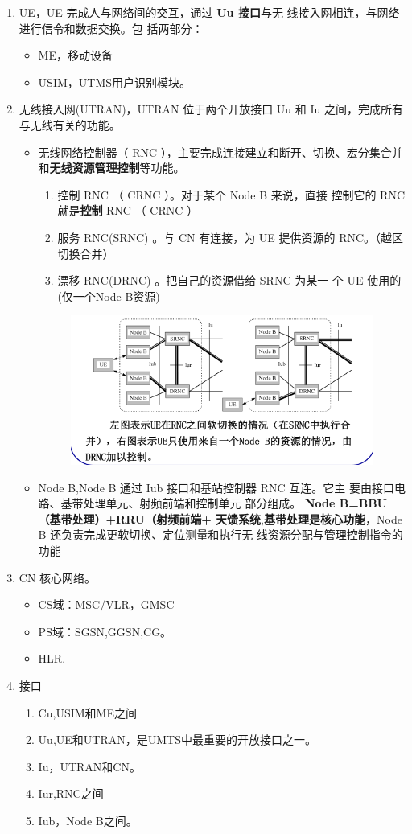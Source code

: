 \begin{enumerate}
	\item UE，UE 完成人与网络间的交互，通过\textbf{ Uu 接口}与无
	线接入网相连，与网络进行信令和数据交换。包
	括两部分：
	\begin{itemize}
		\item ME，移动设备
		\item USIM，UTMS用户识别模块。
	\end{itemize}
	\item 无线接入网(UTRAN)，UTRAN 位于两个开放接口 Uu 和 Iu 之间，完成所有
	与无线有关的功能。
	\begin{itemize}
		\item 无线网络控制器（ RNC ），主要完成连接建立和断开、切换、宏分集合并
		和\textbf{无线资源管理控制}等功能。
		\begin{enumerate}
			\item 控制 RNC （ CRNC ）。对于某个 Node B 来说，直接
			控制它的 RNC 就是\textbf{控制} RNC （ CRNC ）
			\item 服务 RNC(SRNC) 。与 CN 有连接，为 UE 提供资源的
			RNC。（越区切换合并）
			\item 漂移 RNC(DRNC) 。把自己的资源借给 SRNC 为某一
			个 UE 使用的(仅一个Node B资源)
		\end{enumerate}
		\begin{figure}[H]
			\centering
			\includegraphics[width=0.7\linewidth]{figures/screenshot012}
			\caption{}
			\label{fig:screenshot012}
		\end{figure}
		\item Node B,Node B 通过 Iub 接口和基站控制器 RNC 互连。它主
		要由接口电路、基带处理单元、射频前端和控制单元
		部分组成。\textbf{ Node B=BBU（基带处理）+RRU（射频前端+ 天馈系统},\textbf{基带处理是核心功能}，Node B 还负责完成更软切换、定位测量和执行无
		线资源分配与管理控制指令的功能
	\end{itemize}
	\item  CN 核心网络。
	\begin{itemize}
		\item CS域：MSC/VLR，GMSC
		\item PS域：SGSN,GGSN,CG。
		\item HLR.
	\end{itemize}
	\item 接口
	\begin{enumerate}
		\item Cu,USIM和ME之间
		\item Uu,UE和UTRAN，是UMTS中最重要的开放接口之一。
		\item Iu，UTRAN和CN。
		\item Iur,RNC之间
		\item Iub，Node B之间。
	\end{enumerate}
\end{enumerate}
